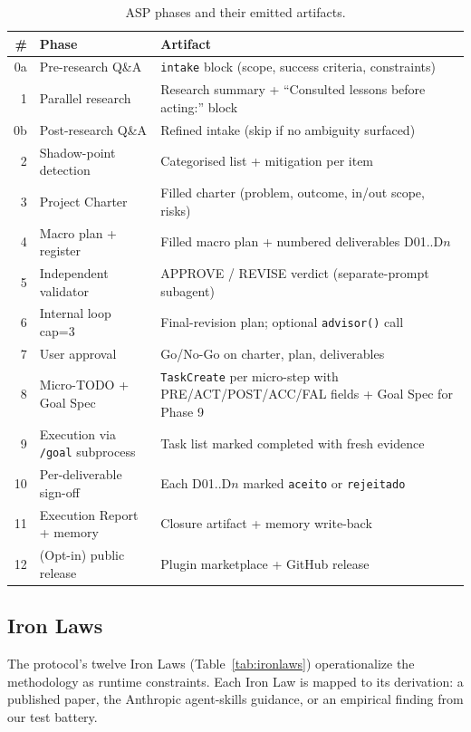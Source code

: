 \documentclass[11pt, a4paper]{article}
\begin{document}
\begin{table}[ht]
\centering
\small
\caption{ASP phases and their emitted artifacts.}
\label{tab:artifacts}
\begin{tabular}{rlp{8.5cm}}
\toprule
\textbf{\#} & \textbf{Phase} & \textbf{Artifact} \\
\midrule
0a & Pre-research Q\&A     & \texttt{intake} block (scope, success criteria, constraints) \\
1  & Parallel research     & Research summary + ``Consulted lessons before acting:'' block \\
0b & Post-research Q\&A    & Refined intake (skip if no ambiguity surfaced) \\
2  & Shadow-point detection & Categorised list + mitigation per item \\
3  & Project Charter        & Filled charter (problem, outcome, in/out scope, risks) \\
4  & Macro plan + register  & Filled macro plan + numbered deliverables D01..D$n$ \\
5  & Independent validator  & APPROVE / REVISE verdict (separate-prompt subagent) \\
6  & Internal loop cap=3    & Final-revision plan; optional \texttt{advisor()} call \\
7  & User approval          & Go/No-Go on charter, plan, deliverables \\
8  & Micro-TODO + Goal Spec & \texttt{TaskCreate} per micro-step with PRE/ACT/POST/ACC/FAL fields + Goal Spec for Phase 9 \\
9  & Execution via \texttt{/goal} subprocess & Task list marked completed with fresh evidence \\
10 & Per-deliverable sign-off & Each D01..D$n$ marked \texttt{aceito} or \texttt{rejeitado} \\
11 & Execution Report + memory & Closure artifact + memory write-back \\
12 & (Opt-in) public release  & Plugin marketplace + GitHub release \\
\bottomrule
\end{tabular}
\end{table}

\subsection{Iron Laws}
\label{ssec:ironlaws}

The protocol's twelve Iron Laws (Table~\ref{tab:ironlaws}) operationalize the methodology as runtime constraints. Each Iron Law is mapped to its derivation: a published paper, the Anthropic agent-skills guidance, or an empirical finding from our test battery.
\end{document}
